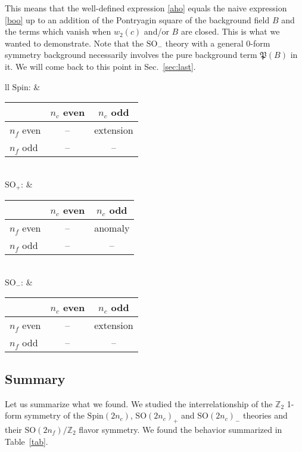 \documentclass[12pt]{article}
\numberwithin{equation}{section}
\renewenvironment{table}[1][]{
  \begin{originaltable}[#1]
    \begin{mdframed}[linecolor=black!0,backgroundcolor=black!1]
}{
    \end{mdframed}
  \end{originaltable}
}%
\newcommand*{\bZ}{\mathbb{Z}}
\newcommand*{\fP}{\mathfrak{P}}
\def\SO{\mathrm{SO}}
\def\so{\mathfrak{so}}
\def\Spin{\mathrm{Spin}}
\begin{document}
This means that the well-defined expression \eqref{aho} equals the naive expression \eqref{boo} 
up to an addition of the Pontryagin square of the background field $B$ and the terms which vanish when $ w_2(c)$ and/or $B$ are closed.
This is what we wanted to demonstrate.
Note that the $\SO_-$ theory with a general 0-form symmetry background necessarily involves the pure background term $\fP(B)$ in it.
We will come back to this point in Sec.~\ref{sec:last}.

\begin{table}
\centering
\begin{tabular}{ll}
				$\Spin$: &
\begin{tabular}{l|cc}
	 & $n_c$ even & $n_c$ odd\\
		\hline
		$n_f$ even   & -- &  extension \\
		$n_f$ odd    & -- & --
\end{tabular} \\[2em]
 $\SO_+$:  &
\begin{tabular}{l|cc}
		 & $n_c$ even & $n_c$ odd\\
		\hline
		$n_f$ even   & -- &  anomaly \\
		$n_f$ odd    & -- & --
\end{tabular} \\[2em]
$\SO_-$: &
\begin{tabular}{l|cc}
				 & $n_c$ even & $n_c$ odd\\
		\hline
		$n_f$ even   & -- &  extension \\
		$n_f$ odd    & -- & --
\end{tabular} 
\end{tabular} 
\caption{The extension and the anomaly of the $\so(2n_c)$ gauge theory with $N_f=2n_f$ flavors, in the three cases $\Spin$, $\SO_+$ and $\SO_-$.
The symbol -- signifies that there is neither nontrivial extension nor nontrivial anomaly.
\label{tab}}
\end{table}

\subsection{Summary}
Let us summarize what we found. 
We studied the interrelationship of the $\bZ_2$ 1-form symmetry of the $\Spin(2n_c)$, $\SO(2n_c)_+$ and $\SO(2n_c)_-$ theories and 
their $\SO(2n_f)/\bZ_2$ flavor symmetry. 
We found the  behavior summarized in Table~\ref{tab}.
\end{document}
